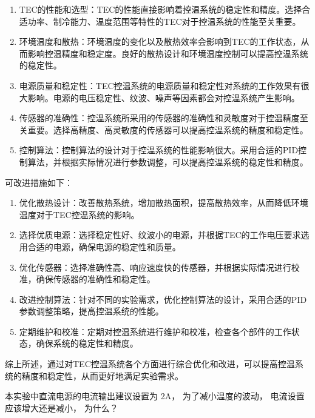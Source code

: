 \documentclass[dvipsnames, svgnames,a4paper,11pt]{article}
\begin{document}
        \begin{enumerate}
            \item TEC的性能和选型：TEC的性能直接影响着控温系统的稳定性和精度。选择合适功率、制冷能力、温度范围等特性的TEC对于控温系统的性能至关重要。
            \item 环境温度和散热：环境温度的变化以及散热效率会影响到TEC的工作状态，从而影响控温精度和稳定度。良好的散热设计和环境温度控制可以提高控温系统的稳定性。
            \item 电源质量和稳定性：TEC控温系统的电源质量和稳定性对系统的工作效果有很大影响。电源的电压稳定性、纹波、噪声等因素都会对控温系统产生影响。
            \item 传感器的准确性：控温系统所采用的传感器的准确性和灵敏度对于控温精度至关重要。选择高精度、高灵敏度的传感器可以提高控温系统的精度和稳定性。
            \item 控制算法：控制算法的设计对于控温系统的性能影响很大。采用合适的PID控制算法，并根据实际情况进行参数调整，可以提高控温系统的稳定性和精度。
        \end{enumerate}
    

    可改进措施如下：
    
        \begin{enumerate}
            \item 优化散热设计：改善散热系统，增加散热面积，提高散热效率，从而降低环境温度对于TEC控温系统的影响。
            \item 选择优质电源：选择稳定性好、纹波小的电源，并根据TEC的工作电压要求选用合适的电源，确保电源的稳定性和质量。
            \item 优化传感器：选择准确性高、响应速度快的传感器，并根据实际情况进行校准，确保传感器的准确性和稳定性。
            \item 改进控制算法：针对不同的实验需求，优化控制算法的设计，采用合适的PID参数调整策略，提高控温系统的性能。
            \item 定期维护和校准：定期对控温系统进行维护和校准，检查各个部件的工作状态，确保系统的稳定性和精度。
        \end{enumerate}


    综上所述，通过对TEC控温系统各个方面进行综合优化和改进，可以提高控温系统的精度和稳定性，从而更好地满足实验需求。
    


    \begin{question}
        本实验中直流电源的电流输出建议设置为 2A， 为了减小温度的波动， 电流设置应该增大还是减小， 为什么？
    \end{question}
\end{document}
